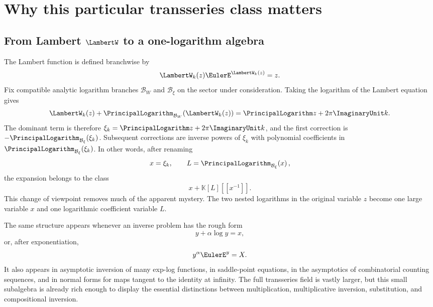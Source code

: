 \documentclass[11pt]{article}
\theoremstyle{pltheorem}
\newcommand{\K}{\mathbb K}
\newcommand{\LogarithmOnBranch}[2]{%
  \PrincipalLogarithm_{#1}\!\left(#2\right)%
}
\begin{document}
\tableofcontents
\newpage

\section{Why this particular transseries class matters}
\label{sec:motivation}

\subsection{\texorpdfstring{From Lambert \(\LambertW\) to a one-logarithm algebra}{From Lambert W to a one-logarithm algebra}}

The Lambert function is defined branchwise by
\begin{equation}\label{eq:W-definition}
 \LambertW_k(z)\EulerE^{\LambertW_k(z)}=z.
\end{equation}
Fix compatible analytic logarithm branches \(\mathcal B_W\) and
\(\mathcal B_\xi\) on the sector under consideration.  Taking the logarithm
of the Lambert equation gives
\begin{equation}\label{eq:W-log-equation}
 \LambertW_k(z)+\LogarithmOnBranch{\mathcal B_W}{\LambertW_k(z)}
 =\PrincipalLogarithm z+2\pi\ImaginaryUnit k.
\end{equation}
The dominant term is therefore
\(\xi_k=\PrincipalLogarithm z+2\pi\ImaginaryUnit k\), and the first correction is
\(-\LogarithmOnBranch{\mathcal B_\xi}{\xi_k}\).  Subsequent corrections are inverse powers of \(\xi_k\) with polynomial coefficients in \(\LogarithmOnBranch{\mathcal B_\xi}{\xi_k}\).  In other words, after renaming
\[
 x=\xi_k,\qquad L=\LogarithmOnBranch{\mathcal B_\xi}{x},
\]
the expansion belongs to the class
\begin{equation}\label{eq:basic-class-preview}
 x+\K[L][[x^{-1}]].
\end{equation}
This change of viewpoint removes much of the apparent mystery.  The two nested logarithms in the original variable \(z\) become one large variable \(x\) and one logarithmic coefficient variable \(L\).

The same structure appears whenever an inverse problem has the rough form
\[
 y+\alpha\log y=x,
\]
or, after exponentiation,
\[
 y^\alpha\EulerE^y=X.
\]
It also appears in asymptotic inversion of many exp-log functions, in saddle-point equations, in the asymptotics of combinatorial counting sequences, and in normal forms for maps tangent to the identity at infinity.  The full transseries field is vastly larger, but this small subalgebra is already rich enough to display the essential distinctions between multiplication, multiplicative inversion, substitution, and compositional inversion.
\end{document}
